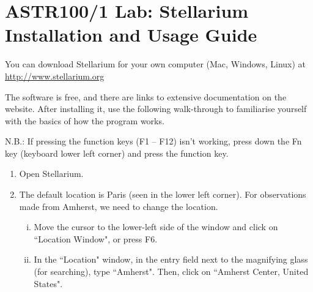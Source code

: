 \documentclass[main.tex]{subfiles}
\begin{document}
\rightline{\today}
\section*{ASTR100/1 Lab: Stellarium Installation and Usage Guide}
You can download Stellarium for your own computer (Mac, Windows, Linux) at \url{http://www.stellarium.org}

The software is free, and there are links to extensive documentation on the website. After installing it, use the following walk-through to familiarise yourself with the basics of how the program works.

N.B.: If pressing the function keys (F1 -- F12) isn't working, press down the Fn key (keyboard lower left corner) and press the function key.
\begin{enumerate}
\item
Open Stellarium.
\item
The default location is Paris (seen in the lower left corner). For observations made from Amherst, we need to change the location.
\begin{enumerate}[i.]
    \item
    Move the cursor to the lower-left side of the window and click on ``Location Window", or press F6.
    \item
    In the ``Location" window, in the entry field next to the magnifying glass (for searching), type ``Amherst". Then, click on ``Amherst Center, United States".
    

\end{enumerate}
\end{enumerate}
\end{document}
